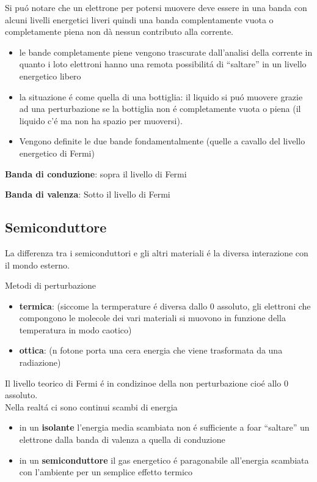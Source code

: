 Si pu\'o notare che un elettrone per potersi muovere deve essere in una banda con alcuni livelli energetici liveri quindi una banda complentamente vuota o completamente piena non d\`a nessun contributo alla corrente.
\begin{itemize}
    \item le bande completamente piene vengono trascurate dall'analisi della corrente in quanto i loto elettroni hanno una remota possibilit\'a di ``saltare'' in un livello energetico libero
    \item la situazione \'e come quella di una bottiglia: il liquido si pu\'o muovere grazie ad una perturbazione se la bottiglia non \'e completamente vuota o piena (il liquido c'\'e ma non ha spazio per muoversi).
    \item Vengono definite le due bande fondamentalmente (quelle a cavallo del livello energetico di Fermi)
\end{itemize}

\textbf{Banda di conduzione}: sopra il livello di Fermi


\textbf{Banda di valenza}: Sotto il livello di Fermi


\subsection{Semiconduttore}
La differenza tra i semiconduttori e gli altri materiali \'e la diversa interazione con il mondo esterno.

Metodi  di perturbazione
\begin{itemize}
    \item \textbf{termica}: (siccome la termperature \'e diversa dallo 0 assoluto, gli elettroni che compongono le molecole dei vari materiali si muovono in funzione della temperatura in modo caotico)
    \item \textbf{ottica}: (n fotone porta una cera energia che viene trasformata da una radiazione)
\end{itemize}

Il livello teorico di Fermi \'e in condizinoe della non perturbazione cio\'e allo 0 assoluto.\\
Nella realt\'a ci sono continui scambi di energia

\begin{itemize}
    \item in un \textbf{isolante} l'energia media scambiata non \'e sufficiente a foar ``saltare'' un elettrone dalla banda di valenza a quella di conduzione
    \item in un \textbf{semiconduttore} il gas energetico \'e paragonabile all'energia scambiata con l'ambiente per un semplice effetto termico
\end{itemize}

